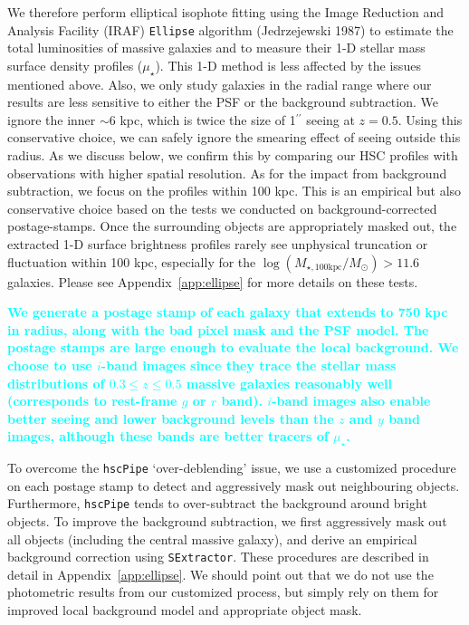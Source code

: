 \documentclass[fleqn,usenatbib]{mnras}
\def\asec{$^{\prime\prime}$}
\def\logmtot{{$\log (M_{\star,100\mathrm{kpc}}/M_{\odot})$}}
\def\mden{{$\mu_{\star}$}}
\newcommand{\song}[1]{\textcolor{cyan}{\textbf{#1}}}
\begin{document}
    We therefore perform elliptical isophote fitting using the Image Reduction 
    and Analysis Facility (IRAF) \texttt{Ellipse} algorithm (Jedrzejewski 1987) 
    to estimate the total luminosities of massive galaxies and to measure their 
    1-D stellar mass surface density profiles (\mden{}). 
    This 1-D method is less affected by the issues mentioned above. 
    Also, we only study galaxies in the radial range where our results are less 
    sensitive to either the PSF or the background subtraction.
    We ignore the inner $\sim6$ kpc, which is twice the size of 1\asec{} seeing 
    at $z=0.5$.
    Using this conservative choice, we can safely ignore the smearing effect of 
    seeing outside this radius.
    As we discuss below, we confirm this by comparing our HSC profiles with 
    observations with higher spatial resolution. 
    As for the impact from background subtraction, we focus on the profiles 
    within 100 kpc. 
    This is an empirical but also conservative choice based on the tests we 
    conducted on background-corrected postage-stamps. 
    Once the surrounding objects are appropriately masked out, the extracted 1-D 
    surface brightness profiles rarely see unphysical truncation or fluctuation 
    within 100 kpc, especially for the \logmtot{}$>11.6$ galaxies. 
    Please see Appendix~\ref{app:ellipse} for more details on these tests.
    
    \song{
    We generate a postage stamp of each galaxy that extends to 750 kpc in radius, 
    along with the bad pixel mask and the PSF model. 
    The postage stamps are large enough to evaluate the local background. 
    We choose to use $i$-band images since they trace the stellar mass distributions 
    of $0.3 \leq z \leq 0.5$ massive galaxies reasonably well 
    (corresponds to rest-frame $g$ or $r$ band). $i$-band images also enable better 
    seeing and lower background levels than the $z$ and $y$ band images, although 
    these bands are better tracers of \mden{}. 
    }
    
    To overcome the \texttt{hscPipe} `over-deblending' issue, we use a customized 
    procedure on each postage stamp to detect and aggressively mask out 
    neighbouring objects. 
    Furthermore, \texttt{hscPipe} tends to over-subtract the background around 
    bright objects. 
    To improve the background subtraction, we first aggressively mask 
    out all objects (including the central massive galaxy), and derive an 
    empirical background correction using \texttt{SExtractor}.
    These procedures are described in detail in Appendix~\ref{app:ellipse}. 
    We should point out that we do not use the photometric results from our 
    customized process, but simply rely on them for improved local background model
    and appropriate object mask.
\end{document}
